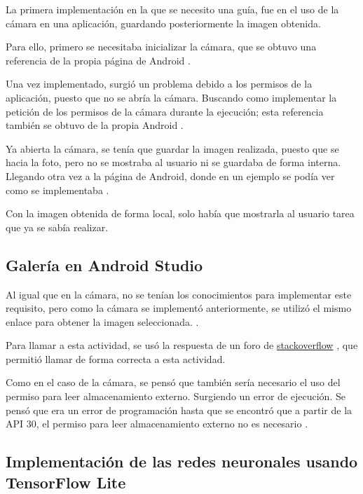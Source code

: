 La primera implementación en la que se necesito una guía, fue en el uso de la cámara en una aplicación, guardando posteriormente la imagen obtenida.

Para ello, primero se necesitaba inicializar la cámara, que se obtuvo una referencia de la propia página de  Android \cite{android-camera-intents}.

Una vez implementado, surgió un problema debido a los permisos de la aplicación, puesto que no se abría la cámara. Buscando como implementar la petición de los permisos de la cámara durante la ejecución; esta referencia también se obtuvo de la propia Android \cite{android-permissions-requesting}.

Ya abierta la cámara, se tenía que guardar la imagen realizada, puesto que se hacia la foto, pero no se mostraba al usuario ni se guardaba de forma interna. Llegando otra vez a la página de Android, donde en un ejemplo se podía ver como se implementaba \cite{android-intents-result}. 

Con la imagen obtenida de forma local, solo había que mostrarla al usuario tarea que ya se sabía realizar.

\subsection{Galería en Android Studio}

Al igual que en la cámara, no se tenían los conocimientos para implementar este requisito, pero como la cámara se implementó anteriormente, se utilizó el mismo enlace para obtener la imagen seleccionada. \cite{android-intents-result}. 

Para llamar a esta actividad, se usó la respuesta de un foro de \href{https://stackoverflow.com/questions/38352148/get-image-from-the-gallery-and-show-in-imageview}{stackoverflow} \cite{stackoverflow-gallery-imageview}, que permitió llamar de forma correcta a esta actividad.

Como en el caso de la cámara, se pensó que también sería necesario el uso del permiso para leer almacenamiento externo. Surgiendo un error de ejecución. Se pensó que era un error de programación hasta que se encontró que a partir de la API 30, el permiso para leer almacenamiento externo no es necesario \cite{android-storage-privacy}.

\subsection{Implementación de las redes neuronales usando TensorFlow Lite}

